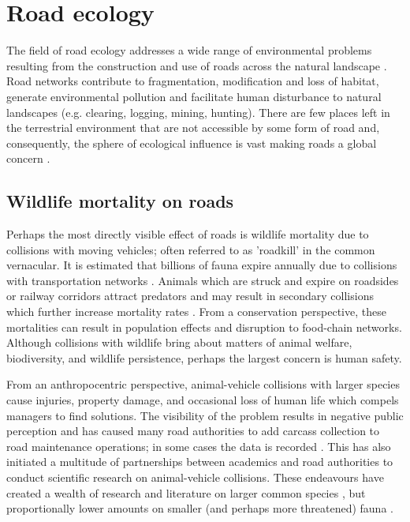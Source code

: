 \section{Road ecology}

The field of road ecology addresses a wide range of environmental problems resulting from the construction and use of roads across the natural landscape \citep{form03,rvdr15}. Road networks contribute to fragmentation, modification and loss of habitat, generate environmental pollution and facilitate human disturbance to natural landscapes (e.g. clearing, logging, mining, hunting). There are few places left in the terrestrial environment that are not accessible by some form of road and, consequently, the sphere of ecological influence is vast making roads a global concern \citep{laur14}.

\subsection{Wildlife mortality on roads}

Perhaps the most directly visible effect of roads is wildlife mortality due to collisions with moving vehicles; often referred to as 'roadkill' in the common vernacular.  It is estimated that billions of fauna expire annually due to collisions with transportation networks \citep{seil06}.  Animals which are struck and expire on roadsides or railway corridors attract predators and may result in secondary collisions which further increase mortality rates \citep{spel98}.  From a conservation perspective, these mortalities can result in population effects and disruption to food-chain networks.  Although collisions with wildlife bring about matters of animal welfare, biodiversity, and wildlife persistence, perhaps the largest concern is human safety. 

From an anthropocentric perspective, animal-vehicle collisions with larger species cause injuries, property damage, and occasional loss of human life which compels managers to find solutions. The visibility of the problem results in negative public perception and has caused many road authorities to add carcass collection to road maintenance operations; in some cases the data is recorded \citep{huij07a}. This has also initiated a multitude of partnerships between academics and road authorities to conduct scientific research on animal-vehicle collisions.  These endeavours have created a wealth of research and literature on larger common species \citep{biss08b,clev01,romi96,sudh09}, but proportionally lower amounts on smaller (and perhaps more threatened) fauna \citep{clev03}.

